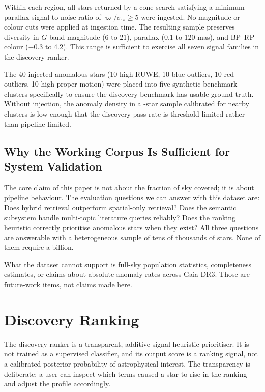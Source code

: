 \documentclass[12pt]{elsarticle}
\newcommand{\parallax}{\varpi}
\begin{document}
Within each region, all stars returned by a cone search satisfying a minimum parallax signal-to-noise ratio of $\parallax / \sigma_\parallax \ge 5$ were ingested. No magnitude or colour cuts were applied at ingestion time. The resulting sample preserves diversity in $G$-band magnitude (6 to 21), parallax (0.1 to 120 mas), and BP--RP colour ($-0.3$ to 4.2). This range is sufficient to exercise all seven signal families in the discovery ranker.

The 40 injected anomalous stars (10 high-RUWE, 10 blue outliers, 10 red outliers, 10 high proper motion) were placed into five synthetic benchmark clusters specifically to ensure the discovery benchmark has usable ground truth. Without injection, the anomaly density in a \nStarsReal{}-star sample calibrated for nearby clusters is low enough that the discovery pass rate is threshold-limited rather than pipeline-limited.

\subsection{Why the Working Corpus Is Sufficient for System Validation}
\label{sec:sufficient}

The core claim of this paper is not about the fraction of sky covered; it is about pipeline behaviour. The evaluation questions we can answer with this dataset are: Does hybrid retrieval outperform spatial-only retrieval? Does the semantic subsystem handle multi-topic literature queries reliably? Does the ranking heuristic correctly prioritise anomalous stars when they exist? All three questions are answerable with a heterogeneous sample of tens of thousands of stars. None of them require a billion.

What the dataset cannot support is full-sky population statistics, completeness estimates, or claims about absolute anomaly rates across Gaia DR3. Those are future-work items, not claims made here.

\section{Discovery Ranking}
\label{sec:ranking}

The discovery ranker is a transparent, additive-signal heuristic prioritiser. It is not trained as a supervised classifier, and its output score is a ranking signal, not a calibrated posterior probability of astrophysical interest. The transparency is deliberate: a user can inspect which terms caused a star to rise in the ranking and adjust the profile accordingly.
\end{document}
